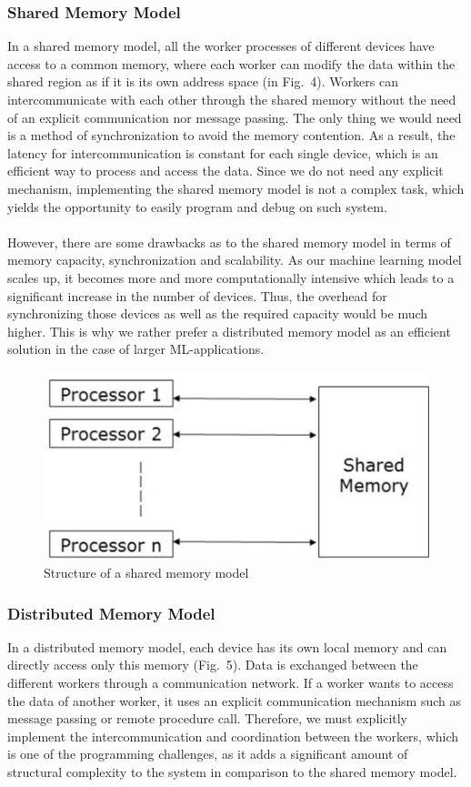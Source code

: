 \documentclass[ieeetran]{article}
\begin{document}
\subsubsection{Shared Memory Model} %
\label{ssub:shared_memory_model}
In a shared memory model, all the worker processes of different devices have access to a common memory, where each worker can modify the data within the shared region as if it is its own address space (in Fig.\ 4). Workers can intercommunicate with each other through the shared memory without the need of an explicit communication nor message passing. The only thing we would need is a method of synchronization to avoid the memory contention. As a result, the latency for intercommunication is constant for each single device, which is an efficient way to process and access the data. Since we do not need any explicit mechanism, implementing the shared memory model is not a complex task, which yields the opportunity to easily program and debug on such system. 
\\ \\However, there are some drawbacks as to the shared memory model in terms of memory capacity, synchronization and scalability. As our machine learning model scales up, it becomes more and more computationally intensive which leads to a significant increase in the number of devices. Thus, the overhead for synchronizing those devices as well as the required capacity would be much higher. This is why we rather prefer a distributed memory model as an efficient solution in the case of larger ML-applications.


\begin{figure}[h!]
  \centering
  \includegraphics[width=0.4\linewidth]{sharedmemorymodel}
  \caption{Structure of a shared memory model}
  \label{fig:sharedmemorymodel}
\end{figure}


\subsubsection{Distributed Memory Model} %
\label{ssub:distributed_memory_model}
In a distributed memory model, each device has its own local memory and can directly access only this memory (Fig.\ 5). Data is exchanged between the different workers through a communication network. If a worker wants to access the data of another worker, it uses an explicit communication mechanism such as message passing or remote procedure call. Therefore, we must explicitly implement the intercommunication and coordination between the workers, which is one of the programming challenges, as it adds a significant amount of structural complexity to the system in comparison to the shared memory model. 
\end{document}

